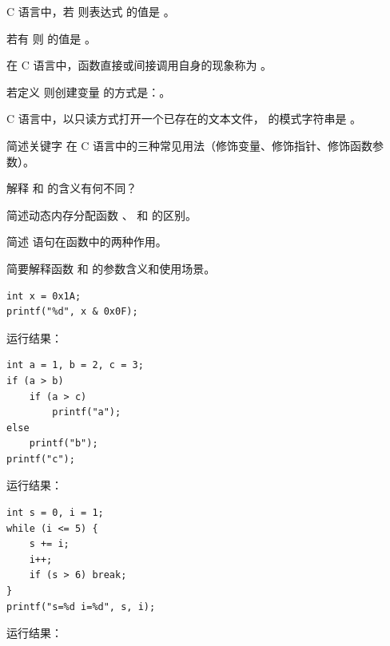 \documentclass[a4paper,11pt]{article}
\begin{document}
\examtitle


\anslines{0.1cm}

\q C 语言中，若  则表达式  的值是 \fillblank 。

\q 若有  则  的值是 \fillblank 。

\q 在 C 语言中，函数直接或间接调用自身的现象称为 \fillblank 。

\q 若定义  则创建变量  的方式是：\fillblank 。

\q C 语言中，以只读方式打开一个已存在的文本文件， 的模式字符串是 \fillblank 。


\q 简述关键字  在 C 语言中的三种常见用法（修饰变量、修饰指针、修饰函数参数）。
\anslines{1.5cm}

\q 解释  和  的含义有何不同？
\anslines{1.5cm}

\q 简述动态内存分配函数 、 和  的区别。
\anslines{1.5cm}

\q 简述  语句在函数中的两种作用。
\anslines{1.5cm}

\q 简要解释函数  和  的参数含义和使用场景。
\anslines{1.5cm}


\q
\begin{lstlisting}[language={[custom]C}]
int x = 0x1A;
printf("%d", x & 0x0F);
\end{lstlisting}
运行结果：\underline{\hspace{3cm}}


\q
\begin{lstlisting}[language={[custom]C}]
int a = 1, b = 2, c = 3;
if (a > b)
    if (a > c)
        printf("a");
else
    printf("b");
printf("c");
\end{lstlisting}
运行结果：\underline{\hspace{3cm}}


\q
\begin{lstlisting}[language={[custom]C}]
int s = 0, i = 1;
while (i <= 5) {
    s += i;
    i++;
    if (s > 6) break;
}
printf("s=%d i=%d", s, i);
\end{lstlisting}
运行结果：\underline{\hspace{3cm}}
\end{document}
